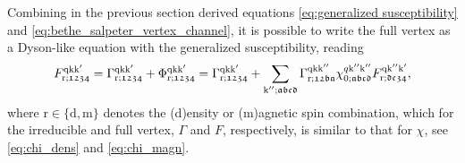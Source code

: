 \documentclass[../../main.tex]{subfiles}
\begin{document}
Combining in the previous section derived equations \eqref{eq:generalized susceptibility} and \eqref{eq:bethe_salpeter_vertex_channel}, it is possible to write the full vertex as a Dyson-like equation with the generalized susceptibility, reading
\begin{align}
	F_{\text{r};\mathfrak{1234}}^{\text{q}\text{k}\text{k}'}=\Gamma_{\text{r};\mathfrak{1234}}^{\text{q}\text{k}\text{k}'}+\Phi_{\text{r};\mathfrak{1234}}^{\text{q}\text{k}\text{k}'}=\Gamma_{\text{r};\mathfrak{1234}}^{\text{q}\text{k}\text{k}'}+\sum_{\text{k}'';\mathfrak{abcd}}\Gamma_{\text{r};\mathfrak{12ba}}^{\text{q}\text{k}\text{k}''}\chi_{0;\mathfrak{abcd}}^{q\text{k}''\text{k}''} F_{\text{r};\mathfrak{dc34}}^{\text{q}\text{k}''\text{k}'},
\end{align}
where $\text{r}\in\{\text{d},\text{m}\}$ denotes the (d)ensity or (m)agnetic spin combination, which for the irreducible and full vertex, $\Gamma$ and $F$, respectively, is similar to that for $\chi$, see \eqref{eq:chi_dens} and \eqref{eq:chi_magn}.
\end{document}
